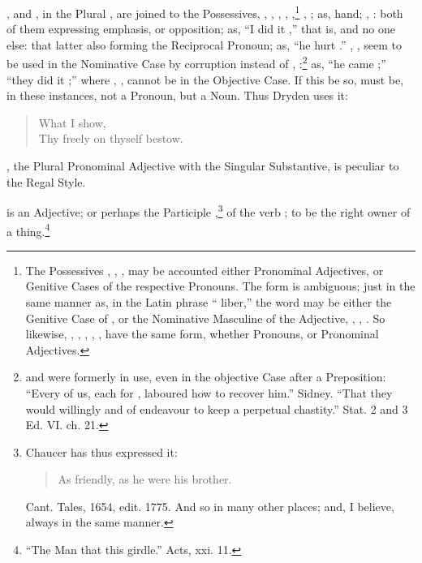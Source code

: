 , and , in the Plural , are joined to the
Possessives, , , , ,
,\footnote{The Possessives , , , may
  be accounted either Pronominal Adjectives, or Genitive Cases of the
  respective Pronouns. The form is ambiguous; just in the same manner
  as, in the Latin phrase `` liber,'' the word  may
  be either the Genitive Case of , or the Nominative Masculine
  of the Adjective, , , . So likewise,
  , , , , , have the same
  form, whether Pronouns, or Pronominal Adjectives.} ,
; as,  hand; , : both of
them expressing emphasis, or opposition; as, ``I did it ,'' that is, and no one else: that latter also forming the
Reciprocal Pronoun; as, ``he hurt .'' ,
, seem to be used in the Nominative Case by corruption
instead of , :\footnote{ and
   were formerly in use, even in the objective Case
  after a Preposition: ``Every of us, each for , laboured
  how to recover him.'' Sidney. ``That they would willingly and of
   endeavour to keep a perpetual chastity.'' Stat. 2
  and 3 Ed. VI. ch. 21.} as, ``he came ;'' ``they did it
;'' where , , cannot be in the
Objective Case. If this be so,  must be, in these instances,
not a Pronoun, but a Noun. Thus Dryden uses it:

\begin{quote}
  What I show,\\
  Thy  freely on thyself bestow.
\end{quote}

, the Plural Pronominal Adjective with the Singular
Substantive, is peculiar to the Regal Style.

 is an Adjective; or perhaps the Participle
,\footnote{Chaucer has thus expressed it:

  \begin{quote}
    As friendly, as he were his  brother.
  \end{quote}

  Cant. Tales, 1654, edit. 1775. And so in many other places; and, I
  believe, always in the same manner.} of the verb ; to be
the right owner of a thing.\footnote{``The Man that  this
  girdle.'' Acts, xxi. 11.}

